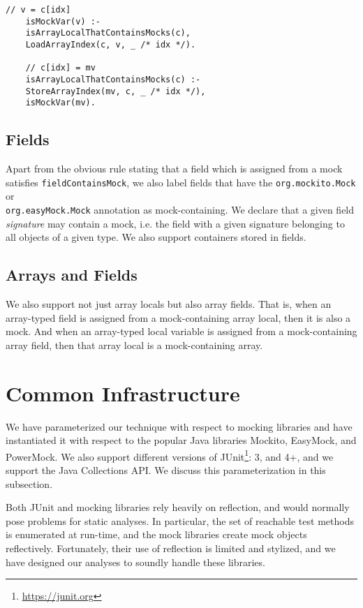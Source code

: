 \begin{lstlisting}[basicstyle=\ttfamily\small,numbers=none]
	// v = c[idx]
	isMockVar(v) :-
	isArrayLocalThatContainsMocks(c),
	LoadArrayIndex(c, v, _ /* idx */).
	
	// c[idx] = mv
	isArrayLocalThatContainsMocks(c) :-
	StoreArrayIndex(mv, c, _ /* idx */),
	isMockVar(mv).
\end{lstlisting}

\subsection{Fields} 

Apart from the obvious rule stating that a field which is assigned from a mock satisfies {\tt fieldContainsMock}, we also label fields that have the {\tt org.mockito.Mock} or \\ {\tt org.easyMock.Mock} annotation as mock-containing. We declare that a given field \emph{signature} may contain a mock, i.e. the field with a given signature belonging to all objects of a given type. We also support containers stored in fields.

\subsection{Arrays and Fields} 

We also support not just array locals but also array fields. That is, when an array-typed field is assigned from a mock-containing array local, then it is also a mock. And when an array-typed local variable is assigned from a mock-containing array field, then that array local is a mock-containing array.

\section{Common Infrastructure}
\label{sec:common}
We have parameterized our technique with respect to mocking libraries and have instantiated it with respect to the popular Java libraries Mockito, EasyMock, and PowerMock. We also support different versions of JUnit\footnote{\url{https://junit.org}}: 3, and 4+, and we support the Java Collections API. We discuss this parameterization in this subsection.

Both JUnit and mocking libraries rely heavily on reflection, and would normally pose problems for static analyses. In particular, the set of reachable test methods is enumerated at run-time, and the mock libraries create mock objects reflectively. Fortunately, their use of reflection is limited and stylized, and we have designed our analyses to soundly handle these libraries.

